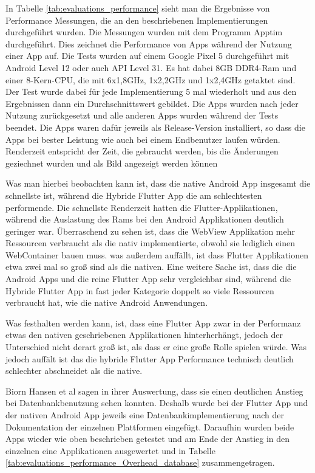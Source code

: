 In Tabelle \ref{tab:evaluations_performance} sieht man die Ergebnisse von Performance Messungen, die an den beschriebenen Implementierungen durchgeführt wurden.
Die Messungen wurden mit dem Programm Apptim durchgeführt. Dies zeichnet die Performance von Apps während der Nutzung einer App auf. Die Tests wurden auf einem Google Pixel 5 durchgeführt mit Android Level 12 oder auch API Level 31. Es hat dabei 8GB DDR4-Ram und einer 8-Kern-CPU, die mit 6x1,8GHz, 1x2,2GHz und 1x2,4GHz getaktet sind.
Der Test wurde dabei für jede Implementierung 5 mal wiederholt und aus den Ergebnissen dann ein Durchschnittswert gebildet. Die Apps wurden nach jeder Nutzung zurückgesetzt und alle anderen Apps wurden während der Tests beendet. Die Apps waren dafür jeweils als Release-Version installiert, so dass die Apps bei bester Leistung wie auch bei einem Endbenutzer laufen würden.
Renderzeit entspricht der Zeit, die gebraucht werden, bis die Änderungen geziechnet wurden und als Bild angezeigt werden können

Was man hierbei beobachten kann ist, dass die native Android App insgesamt die schnellste ist, während die Hybride Flutter App die am schlechtesten performende. Die schnellste Renderzeit hatten die Flutter-Applikationen, während die Auslastung des Rams bei den Android Applikationen deutlich geringer war. Überraschend zu sehen ist, dass die WebView Applikation mehr Ressourcen verbraucht als die nativ implementierte, obwohl sie lediglich einen WebContainer bauen muss. was außerdem auffällt, ist dass Flutter Applikationen etwa zwei mal so groß sind als die nativen. Eine weitere Sache ist, dass die die Android Apps und die reine Flutter App sehr vergleichbar sind, während die Hybride Flutter App in fast jeder Kategorie doppelt so viele Ressourcen verbraucht hat, wie die native Android Anwendungen.

Was festhalten werden kann, ist, dass eine Flutter App zwar in der Performanz etwas den nativen geschriebenen Applikationen hinterherhängt, jedoch der Unterschied nicht derart groß ist, als dass er eine große Rolle spielen würde. Was jedoch auffält ist das die hybride Flutter App Performance technisch deutlich schlechter abschneidet als die native.  

Biorn Hansen et al\cite{BirnHansen.2020} sagen in ihrer Auswertung, dass sie einen deutlichen Anstieg bei Datenbankbenutzung sehen konnten. Deshalb wurde bei der Flutter App und der nativen Android App  jeweils eine Datenbankimplementierung nach der Dokumentation der einzelnen Plattformen eingefügt. Daraufhin wurden beide Apps wieder wie oben beschrieben getestet und am Ende der Anstieg in den einzelnen eine Applikationen ausgewertet und in Tabelle \ref{tab:evaluations_performance_Overhead_database} zusammengetragen.

